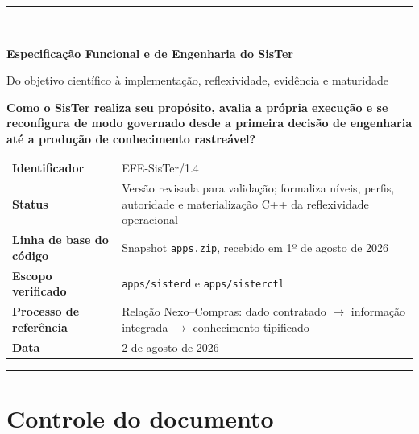 \documentclass[11pt,a4paper,oneside]{article}
\begin{document}
\begin{titlepage}
\pagestyle{empty}
\thispagestyle{empty}
\vspace*{2.2cm}
{\color{sisterblue}\rule{\textwidth}{1.2pt}}\\[1.2cm]
{\Huge\bfseries Especificação Funcional e de Engenharia do SisTer\par}
\vspace{0.45cm}
{\Large Do objetivo científico à implementação, reflexividade, evidência e maturidade\par}
\vspace{1.2cm}
\begin{principio}
\centering\Large\textbf{Como o SisTer realiza seu propósito, avalia a própria execução e se reconfigura de modo governado desde a primeira decisão de engenharia até a produção de conhecimento rastreável?}
\end{principio}
\vfill
\begin{tabularx}{\textwidth}{P{4.2cm}Y}
\toprule
\textbf{Identificador} & EFE-SisTer/1.4 \\
\textbf{Status} & Versão revisada para validação; formaliza níveis, perfis, autoridade e materialização C++ da reflexividade operacional \\
\textbf{Linha de base do código} & Snapshot \texttt{apps.zip}, recebido em 1º de agosto de 2026 \\
\textbf{Escopo verificado} & \texttt{apps/sisterd} e \texttt{apps/sisterctl} \\
\textbf{Processo de referência} & Relação Nexo--Compras: dado contratado $\rightarrow$ informação integrada $\rightarrow$ conhecimento tipificado \\
\textbf{Data} & 2 de agosto de 2026 \\
\bottomrule
\end{tabularx}
\vspace{1.2cm}
{\color{sisterblue}\rule{\textwidth}{1.2pt}}
\thispagestyle{empty}
\end{titlepage}
\pagestyle{fancy}

\section*{Controle do documento}
\end{document}
